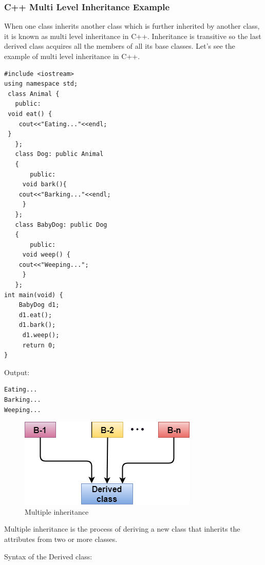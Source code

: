 \documentclass{book}
\begin{document}
\subsubsection{C++ Multi Level Inheritance Example}

When one class inherits another class which is further inherited by another class, it is known as multi level inheritance in C++. Inheritance is transitive so the last derived class acquires all the members of all its base classes. Let's see the example of multi level inheritance in C++.

\begin{lstlisting}
#include <iostream>  
using namespace std;  
 class Animal {  
   public:  
 void eat() {   
    cout<<"Eating..."<<endl;   
 }    
   };  
   class Dog: public Animal   
   {    
       public:  
     void bark(){  
    cout<<"Barking..."<<endl;   
     }    
   };   
   class BabyDog: public Dog   
   {    
       public:  
     void weep() {  
    cout<<"Weeping...";   
     }    
   };   
int main(void) {  
    BabyDog d1;  
    d1.eat();  
    d1.bark();  
     d1.weep();  
     return 0;  
}  
\end{lstlisting}

Output:

\begin{verbatim}
Eating...
Barking...
Weeping...
\end{verbatim}

\begin{figure}[h]
\includegraphics[width=\columnwidth]{multiple-inheritance}%
\caption{Multiple inheritance}%
\label{}%
\end{figure}

Multiple inheritance is the process of deriving a new class that inherits the attributes from two or more classes.

Syntax of the Derived class:
\end{document}

